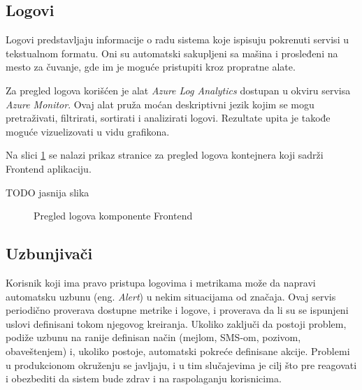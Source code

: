\documentclass[12pt,oneside]{memoir}
\begin{document}
\subsection{Logovi}

Logovi predstavljaju informacije o radu sistema koje ispisuju pokrenuti servisi u tekstualnom formatu. Oni su automatski sakupljeni sa mašina i prosleđeni na mesto za čuvanje, gde im je moguće pristupiti kroz propratne alate.

Za pregled logova korišćen je alat \emph{Azure Log Analytics} dostupan u okviru servisa \emph{Azure Monitor}. Ovaj alat pruža moćan deskriptivni jezik kojim se mogu pretraživati, filtrirati, sortirati i analizirati logovi. Rezultate upita je takođe moguće vizuelizovati u vidu grafikona.

Na slici \ref{fig:frontendlogs} se nalazi prikaz stranice za pregled logova kontejnera koji sadrži Frontend aplikaciju.

TODO jasnija slika

\begin{figure}[!ht]
  \centering
  \caption{Pregled logova komponente Frontend}
  \label{fig:frontendlogs}
\end{figure}


\subsection{Uzbunjivači}

Korisnik koji ima pravo pristupa logovima i metrikama može da napravi automatsku uzbunu (eng. \emph{Alert}) u nekim situacijama od značaja. Ovaj servis periodično proverava dostupne metrike i logove, i proverava da li su se ispunjeni uslovi definisani tokom njegovog kreiranja. Ukoliko zaključi da postoji problem, podiže uzbunu na ranije definisan način (mejlom, SMS-om, pozivom, obaveštenjem) i, ukoliko postoje, automatski pokreće definisane akcije. Problemi u produkcionom okruženju se javljaju, i u tim slučajevima je cilj što pre reagovati i obezbediti da sistem bude zdrav i na raspolaganju korisnicima.
\end{document}

